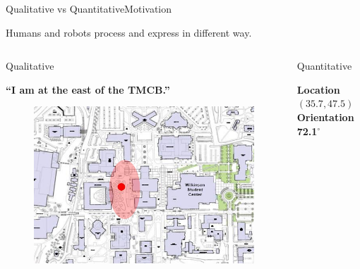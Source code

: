 \begin{frame}{Qualitative vs Quantitative}{Motivation}

\begin{block}{}

Humans and robots process and express in different way.

\end{block}

\begin{columns}

\begin{block}{ Qualitative }

\begin{minipage}[t][5cm][t]{.9\textwidth}

\centering
{\bf ``I am at the east of the TMCB.''}

\begin{figure}
	\includegraphics[width=\linewidth]{figure/human_localization_rough}
\end{figure}
\end{minipage}

\end{block}


\begin{block}{ Quantitative }

\begin{minipage}[t][5cm][t]{.9\textwidth}

\centering
{\bf Location $( 35.7 , 47.5 )$ \\ Orientation 72.1$^{\circ}$}


\end{minipage}
\end{block}
\end{columns}
\end{frame}
